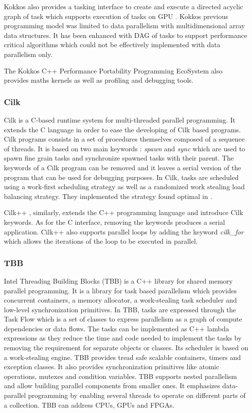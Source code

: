 Kokkos also provides a tasking interface to create and execute a directed acyclic graph of task which supports execution of tasks on GPU \cite{CartI2017}.
Kokkos previous programming model was limited to data parallelism with multidimensional array data structures.
It has been enhanced with DAG of tasks to support performance critical algorithms which could not be effectively implemented with data parallelism only.

The Kokkos C++ Performance Portability Programming EcoSystem also provides maths kernels as well as profiling and debugging tools.

\subsubsection{Cilk}
Cilk \cite{BJKLR1995} is a C-based runtime system for multi-threaded parallel programming.
It extends the C language in order to ease the developing of Cilk based programs.
Cilk programs consists in a set of procedures themselves composed of a sequence of threads.
It is based on two main keywords : \textit{spawn} and \textit{sync} which are used to spawn fine grain tasks and synchronize spawned tasks with their parent.
The keywords of a Cilk program can be removed and it leaves a serial version of the program that can be used for debugging purposes.
In Cilk, tasks are scheduled using a work-first scheduling strategy as well as a randomized work stealing load balancing strategy.
They implemented the strategy found optimal in \cite{BlumL1999}.

Cilk++ \cite{Leise2009}, similarly, extends the C++ programming language and introduce Cilk keywords.
As for the C interface, removing the keywords produces a serial application.
Cilk++ also supports parallel loops by adding the keyword \textit{cilk\_for} which allows the iterations of the loop to be executed in parallel.

\subsubsection{TBB}
Intel Threading Building Blocks (TBB) \cite{Reind2007} \cite{Pheat2008} is a C++ library for shared memory parallel programming.
It is a library for task based parallelism which provides concurrent containers, a memory allocator, a work-stealing task scheduler and low-level synchronization primitives.
In TBB, tasks are expressed through the Task Flow which is a set of classes to express parallelism as a graph of compute dependencies or data flows.
The tasks can be implemented as C++ lambda expressions as they reduce the time and code needed to implement the tasks by removing the requirement for separate objects or classes.
Its scheduler is based on a work-stealing engine.
TBB provides tread safe scalable containers, timers and exception classes.
It also provides synchronization primitives like atomic operations, mutexes and condition variables.
TBB supports nested parallelism and allow building parallel components from smaller ones.
It emphasizes data-parallel programming by enabling several threads to operate on different parts of a collection.
TBB can address CPUs, GPUs and FPGAs.

